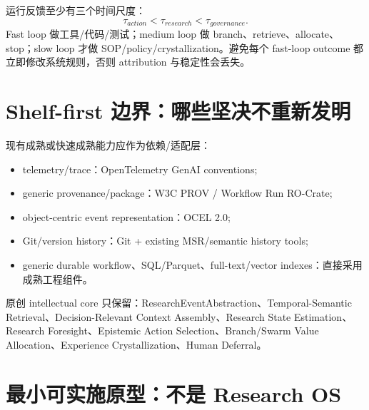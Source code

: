 \documentclass[11pt,a4paper]{ctexart}
\begin{document}
运行反馈至少有三个时间尺度：
\begin{equation}
\tau_{action}<\tau_{research}<\tau_{governance}.
\end{equation}
Fast loop 做工具/代码/测试；medium loop 做 branch、retrieve、allocate、stop；slow loop 才做 SOP/policy/crystallization。避免每个 fast-loop outcome 都立即修改系统规则，否则 attribution 与稳定性会丢失。

\section{Shelf-first 边界：哪些坚决不重新发明}

现有成熟或快速成熟能力应作为依赖/适配层：
\begin{itemize}
\item telemetry/trace：OpenTelemetry GenAI conventions\cite{opentelemetry2026inside};
\item generic provenance/package：W3C PROV / Workflow Run RO-Crate\cite{soiland2024wfrun};
\item object-centric event representation：OCEL 2.0\cite{berti2024ocel};
\item Git/version history：Git + existing MSR/semantic history tools\cite{li2022semantic};
\item generic durable workflow、SQL/Parquet、full-text/vector indexes：直接采用成熟工程组件。
\end{itemize}
原创 intellectual core 只保留：ResearchEventAbstraction、Temporal-Semantic Retrieval、Decision-Relevant Context Assembly、Research State Estimation、Research Foresight、Epistemic Action Selection、Branch/Swarm Value Allocation、Experience Crystallization、Human Deferral。

\section{最小可实施原型：不是 Research OS}
\end{document}
